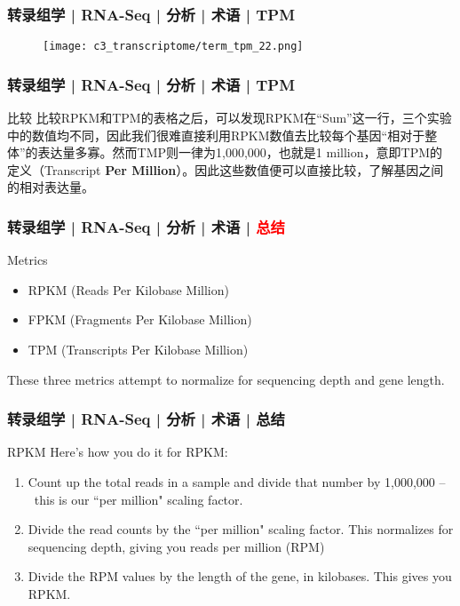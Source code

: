 \begin{frame}
  \frametitle{转录组学 | RNA-Seq | 分析 | 术语 | TPM}
  \begin{figure}
    \centering
    \texttt{[image: c3\_transcriptome/term\_tpm\_22.png]}
  \end{figure}
\end{frame}

\begin{frame}
  \frametitle{转录组学 | RNA-Seq | 分析 | 术语 | TPM}
  \begin{block}{比较}
比较RPKM和TPM的表格之后，可以发现RPKM在“Sum”这一行，三个实验中的数值均不同，因此我们很难直接利用RPKM数值去比较每个基因“相对于整体”的表达量多寡。然而TMP则一律为1,000,000，也就是1 million，意即TPM的定义（Transcript \textbf{Per Million}）。因此这些数值便可以直接比较，了解基因之间的相对表达量。
  \end{block}
\end{frame}

\begin{frame}
  \frametitle{转录组学 | RNA-Seq | 分析 | 术语 | \textcolor{red}{总结}}
  \begin{block}{Metrics}
    \begin{itemize}
      \item RPKM (Reads Per Kilobase Million)
      \item FPKM (Fragments Per Kilobase Million)
      \item TPM (Transcripts Per Kilobase Million)
    \end{itemize}
        These three metrics attempt to normalize for sequencing depth and gene length. 
  \end{block}
\end{frame}

\begin{frame}
  \frametitle{转录组学 | RNA-Seq | 分析 | 术语 | 总结}
  \begin{block}{RPKM}
    Here's how you do it for RPKM:
    \begin{enumerate}
      \item Count up the total reads in a sample and divide that number by 1,000,000 –\ this is our ``per million" scaling factor.
      \item Divide the read counts by the ``per million" scaling factor. This normalizes for sequencing depth, giving you reads per million (RPM)
      \item Divide the RPM values by the length of the gene, in kilobases. This gives you RPKM.
    \end{enumerate}
  \end{block}
\end{frame}

